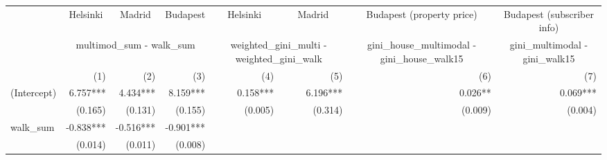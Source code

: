 \begin{tabular}{lrrrrrrr}
\toprule
                                           & \multicolumn{1}{c}{Helsinki} & \multicolumn{1}{c}{Madrid} & \multicolumn{1}{c}{Budapest} &   \multicolumn{1}{c}{Helsinki}   &   \multicolumn{1}{c}{Madrid}   &           \multicolumn{1}{c}{Budapest (property price)}           &    \multicolumn{1}{c}{Budapest (subscriber info)}   \\ 
\cmidrule(lr){2-2} \cmidrule(lr){3-3} \cmidrule(lr){4-4} \cmidrule(lr){5-5} \cmidrule(lr){6-6} \cmidrule(lr){7-7} \cmidrule(lr){8-8} 
                                           &                       \multicolumn{3}{c}{multimod\_sum - walk\_sum}                      &  \multicolumn{2}{c}{weighted\_gini\_multi - weighted\_gini\_walk} & \multicolumn{1}{c}{gini\_house\_multimodal - gini\_house\_walk15} & \multicolumn{1}{c}{gini\_multimodal - gini\_walk15} \\ 
\cmidrule(lr){2-4} \cmidrule(lr){5-6} \cmidrule(lr){7-7} \cmidrule(lr){8-8} 
                                           &                          (1) &                        (2) &                          (3) &                              (4) &                            (5) &                                                               (6) &                                                 (7) \\ 
\midrule
(Intercept)                                &                     6.757*** &                   4.434*** &                     8.159*** &                         0.158*** &                       6.196*** &                                                           0.026** &                                            0.069*** \\ 
                                           &                      (0.165) &                    (0.131) &                      (0.155) &                          (0.005) &                        (0.314) &                                                           (0.009) &                                             (0.004) \\ 
walk\_sum                                  &                    -0.838*** &                  -0.516*** &                    -0.901*** &                                  &                                &                                                                   &                                                     \\ 
                                           &                      (0.014) &                    (0.011) &                      (0.008) &                                  &                                &                                                                   &                                                     \\ 

\end{tabular}
